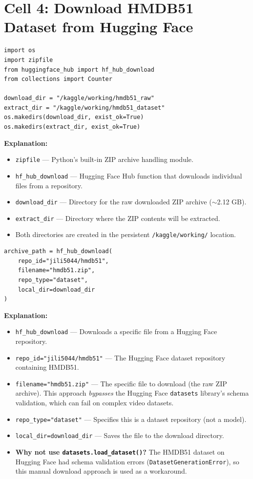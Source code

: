 \documentclass[a4paper, 12pt]{article}
\newenvironment{explanation}{%
  \par\smallskip
  \noindent\textcolor{blue!70!black}{\textbf{Explanation:}}\\
  \noindent
}{\par\medskip}
\begin{document}
\section{Cell 4: Download HMDB51 Dataset from Hugging Face}

\begin{lstlisting}
import os
import zipfile
from huggingface_hub import hf_hub_download
from collections import Counter

download_dir = "/kaggle/working/hmdb51_raw"
extract_dir = "/kaggle/working/hmdb51_dataset"
os.makedirs(download_dir, exist_ok=True)
os.makedirs(extract_dir, exist_ok=True)
\end{lstlisting}

\begin{explanation}
\begin{itemize}[nosep]
  \item \texttt{zipfile} --- Python's built-in ZIP archive handling module.
  \item \texttt{hf\_hub\_download} --- Hugging Face Hub function that downloads individual files from a repository.
  \item \texttt{download\_dir} --- Directory for the raw downloaded ZIP archive ($\sim$2.12 GB).
  \item \texttt{extract\_dir} --- Directory where the ZIP contents will be extracted.
  \item Both directories are created in the persistent \texttt{/kaggle/working/} location.
\end{itemize}
\end{explanation}

\begin{lstlisting}
archive_path = hf_hub_download(
    repo_id="jili5044/hmdb51",
    filename="hmdb51.zip",
    repo_type="dataset",
    local_dir=download_dir
)
\end{lstlisting}

\begin{explanation}
\begin{itemize}[nosep]
  \item \texttt{hf\_hub\_download} --- Downloads a specific file from a Hugging Face repository.
  \item \texttt{repo\_id="jili5044/hmdb51"} --- The Hugging Face dataset repository containing HMDB51.
  \item \texttt{filename="hmdb51.zip"} --- The specific file to download (the raw ZIP archive). This approach \textit{bypasses} the Hugging Face \texttt{datasets} library's schema validation, which can fail on complex video datasets.
  \item \texttt{repo\_type="dataset"} --- Specifies this is a dataset repository (not a model).
  \item \texttt{local\_dir=download\_dir} --- Saves the file to the download directory.
  \item \textbf{Why not use \texttt{datasets.load\_dataset()}?} The HMDB51 dataset on Hugging Face had schema validation errors (\texttt{DatasetGenerationError}), so this manual download approach is used as a workaround.
\end{itemize}
\end{explanation}
\end{document}
